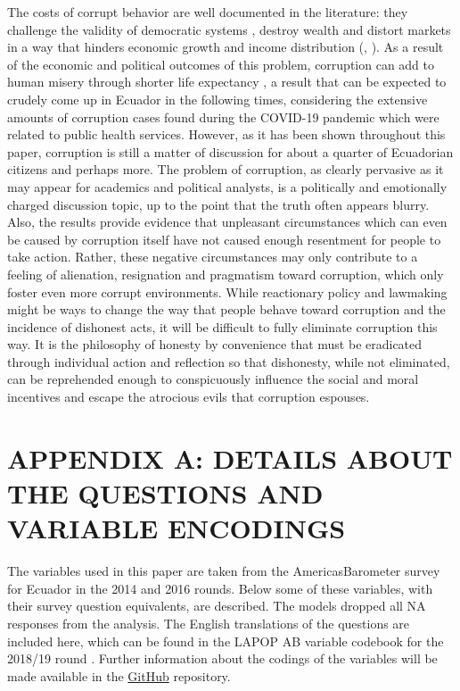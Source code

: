 \documentclass[floatsintext,man]{apa7}\usepackage[]{graphicx}\usepackage[]{color}
\begin{document}
The costs of corrupt behavior are well documented in the literature: they challenge the validity of democratic systems \parencite{Moscoso.2018}, destroy wealth and distort markets in a way that hinders economic growth and income distribution (\textcite{Shleifer.1993}, \textcite{Singer.2016}). As a result of the economic and political outcomes of this problem, corruption can add to human misery through shorter life expectancy \parencite{Siverson.2014}, a result that can be expected to crudely come up in Ecuador in the following times, considering the extensive amounts of corruption cases found during the COVID-19 pandemic which were related to public health services. However, as it has been shown throughout this paper, corruption is still a matter of discussion for about a quarter of Ecuadorian citizens and perhaps more. The problem of corruption, as clearly pervasive as it may appear for academics and political analysts, is a politically and emotionally charged discussion topic, up to the point that the truth often appears blurry. Also, the results provide evidence that unpleasant circumstances which can even be caused by corruption itself have not caused enough resentment for people to take action. Rather, these negative circumstances may only contribute to a feeling of alienation, resignation and pragmatism toward corruption, which only foster even more corrupt environments. While reactionary policy and lawmaking might be ways to change the way that people behave toward corruption and the incidence of dishonest acts, it will be difficult to fully eliminate corruption this way. It is the philosophy of honesty by convenience that must be eradicated through individual action and reflection so that dishonesty, while not eliminated, can be reprehended enough to conspicuously influence the social and moral incentives and escape the atrocious evils that corruption espouses. 
\clearpage



\section{APPENDIX A: DETAILS ABOUT THE QUESTIONS AND VARIABLE ENCODINGS}
\label{app:first}

The variables used in this paper are taken from the AmericasBarometer survey for Ecuador in the 2014 and 2016 rounds. Below some of these variables, with their survey question equivalents, are described. The models dropped all NA responses from the analysis. The English translations of the questions are included here, which can be found in the LAPOP AB variable codebook for the 2018/19 round \parencite{LAPOP.2019}. Further information about the codings of the variables will be made available in the \href{https://github.com/dsanchezp18/ctol-ds2021}{GitHub} repository. 
\end{document}
